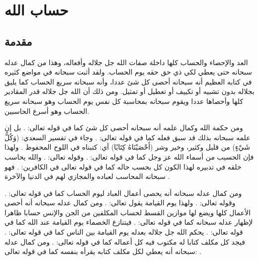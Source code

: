 \chapter{حساب الله}

\section{مقدمة}

العد والإحصاء والحساب كلها داخلة صفات الله جل جلاله وأفعاله، وهذا من كمال عدله سبحانه حتى يعطي لكي ذي حق حقه يوم الحساب. ولقد أثبت سبحانه في مواضع كثيره في كتابه العظيم أنه سبحانه أحصى كل شئ عددا، وأنه سبحانه سريع الحساب كما يليق بجلاله بدون تشبيه أو تكييف أو تعطيل أو تمثيل. ومن ذلك أن الله جل جلاله قدر المقادير كلها وأحصاها عددا ويقوم سبحانه بمحاسبة كل نفس يوم الحساب وهو سبحانه سريع الحساب وهو أسرع الحاسبين.


ومن حكمة الله وكمال علمه أنه سبحانه أحصى كل شئ كما في قوله تعالى: \quranayah*[72][28][10]{\footnotesize \surahname*[72]}. بل إن علمه سبحانه بذلك قد سبق فعله كما في قوله تعالى: \quranayah*[78][29]{\footnotesize \surahname*[78]}. وجاء في تفسير السعدي: (وَكُلُّ شَيْءٍ) من قليل وكثير، وخير وشر (أَحْصَيْنَاهُ كِتَابًا) أي: كتبناه في اللوح المحفوظ \href{https://shamela.ws/book/42/2064#p9}{\faExternalLink} \cite{tafsir_Saadi}. ولهذا فإن الحسيب من أسماء الله عز وجل كما في قوله تعالى: \quranayah*[4][86]{\footnotesize \surahname*[4]}. وقوله تعالى: \quranayah*[33][39]{\footnotesize \surahname*[33]}. والله يحاسب خلقه في تدبيره لهذا الكون كل بحسب حاله كما في قوله تعالى في الكافرين: \quranayah*[65][8]{\footnotesize \surahname*[65]}. فهو سبحانه المحاسب لعباده والمجازي لهم في الدنيا والآخرة \href{https://shamela.ws/book/42/2002#p3}{\faExternalLink} \cite{tafsir_Saadi}.

ومن كمال عدله سبحانه أنه يحصى أعمال العباد ليوم الحساب كما في قوله تعالى: \quranayah*[36][12]{\footnotesize \surahname*[36]}. وقوله تعالى: \quranayah*[58][6]{\footnotesize \surahname*[58]}. ولهذا يوم القيامة يقول تعالى: \quranayah*[18][49]{\footnotesize \surahname*[18]}. ومن كمال عدله سبحانه أنه أحصى الأعمال كلها ويضع لها موازين القسط لحساب المكلفين من الجن والإنس حسابا ظاهرا لإظهار عدله سبحانه كما في قوله تعالى: \quranayah*[21][47]{\footnotesize \surahname*[21]}. فيتنازع الخصماء يوم القيامة عند الله كما في قوله تعالى: \quranayah*[39][31]{\footnotesize \surahname*[39]}. يحكم الله جل جلاله بعدله يوم القيامة بين الناس كما في قوله تعالى: \quranayah*[22][69]{\footnotesize \surahname*[22]}. فيجد كل مكلف كتابا له مكتوب فيه كل أعماله كما في قوله تعالى: \quranayah*[17][13]{\footnotesize \surahname*[17]}. ومن كمال عدله سبحانه أنه يعطي لكل مكلف كتابه يقرأه بنفسه كما في قوله تعالى: \quranayah*[17][14]{\footnotesize \surahname*[14]}.

